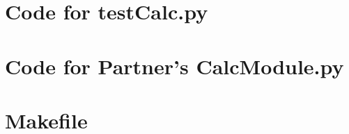 \documentclass[12pt]{article}
\begin{document}
\newpage

\section{Code for testCalc.py}

\noindent 

\newpage

\section{Code for Partner's CalcModule.py}

\noindent 

\newpage

\section{Makefile}

\lstset{language=make}
\noindent 
\end{document}
